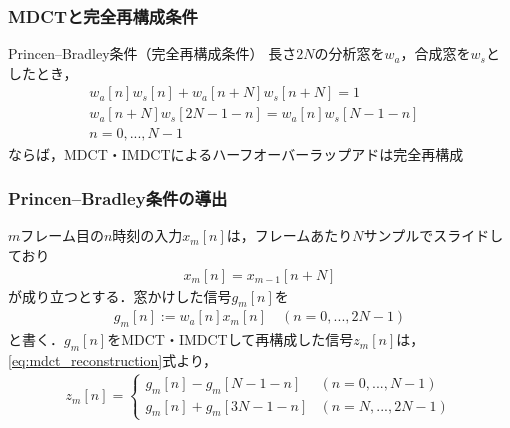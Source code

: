 \documentclass[14pt,xcolor=dvipsnames,table,dvipdfmx]{beamer}
\begin{document}
\begin{frame}[c]
    \frametitle{MDCTと完全再構成条件}
    \begin{block}{Princen--Bradley条件（完全再構成条件）\cite{princen1986analysis}}
        長さ$2N$の分析窓を$w_{a}$，合成窓を$w_{s}$としたとき，
        \begin{align}
            w_{a}[n] w_{s}[n] + w_{a}[n + N]w_{s}[n + N] = 1 & \label{eq:princen_bradley_conditon_1} \\
            w_{a}[n + N] w_{s}[2N - 1 - n] = w_{a}[n]w_{s}[N - 1 - n] & \label{eq:princen_bradley_conditon_2} \\
            n = 0,...,N-1 & \nonumber
        \end{align}
        ならば，MDCT・IMDCTによるハーフオーバーラップアドは完全再構成
    \end{block}
\end{frame}

\begin{frame}[c]
    \frametitle{Princen--Bradley条件の導出}
    $m$フレーム目の$n$時刻の入力$x_{m}[n]$は，フレームあたり$N$サンプルでスライドしており
    \begin{align}
        x_{m}[n] = x_{m - 1}[n + N]
    \end{align}
    が成り立つとする．窓かけした信号$g_{m}[n]$を
    \begin{align}
        g_{m}[n] := w_{a}[n] x_{m}[n] \quad (n = 0, ..., 2N-1)
    \end{align}
    と書く．$g_{m}[n]$をMDCT・IMDCTして再構成した信号$z_{m}[n]$は，\eqref{eq:mdct_reconstruction}式より，
    \small
    \begin{align}
        z_{m}[n] = \left\{ \begin{array}{ll}
            g_{m}[n] - g_{m}[N - 1 - n] & (n = 0, ..., N - 1) \\
            g_{m}[n] + g_{m}[3N - 1 - n] & (n = N, ..., 2N - 1)
        \end{array} \right. \label{eq:windowed_mdct_reconstruction}
    \end{align}
\end{frame}
\end{document}
